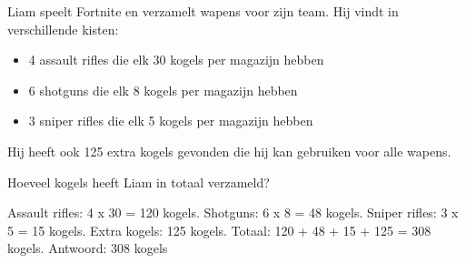 \begin{opgave}
Liam speelt Fortnite en verzamelt wapens voor zijn team. Hij vindt in verschillende kisten:

\begin{itemize}
\item 4 assault rifles die elk 30 kogels per magazijn hebben
\item 6 shotguns die elk 8 kogels per magazijn hebben  
\item 3 sniper rifles die elk 5 kogels per magazijn hebben
\end{itemize}

Hij heeft ook 125 extra kogels gevonden die hij kan gebruiken voor alle wapens.

Hoeveel kogels heeft Liam in totaal verzameld?
\end{opgave}

\begin{oplossing}
Assault rifles: 4 x 30 = 120 kogels.
Shotguns: 6 x 8 = 48 kogels.
Sniper rifles: 3 x 5 = 15 kogels.
Extra kogels: 125 kogels.
Totaal: 120 + 48 + 15 + 125 = 308 kogels.
Antwoord: 308 kogels
\end{oplossing}